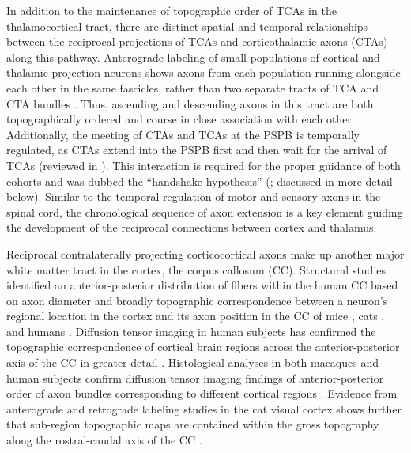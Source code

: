 In addition to the maintenance of topographic order of TCAs in the thalamocortical tract, there are distinct spatial and temporal relationships between the reciprocal projections of TCAs and corticothalamic axons (CTAs) along this pathway. 
Anterograde labeling of small populations of cortical and thalamic projection neurons shows axons from each population running alongside each other in the same fascicles, rather than two separate tracts of TCA and CTA bundles \cite{molnar1998mechanisms}. 
Thus, ascending and descending axons in this tract are both topographically ordered and course in close association with each other. 
Additionally, the meeting of CTAs and TCAs at the PSPB is temporally regulated, as CTAs extend into the PSPB first and then wait for the arrival of TCAs (reviewed in \cite{leyva2013and}). 
This interaction is required for the proper guidance of both cohorts and was dubbed the “handshake hypothesis” (\cite{molnar1995thalamic}; discussed in more detail below). 
Similar to the temporal regulation of motor and sensory axons in the spinal cord, the chronological sequence of axon extension is a key element guiding the development of the reciprocal connections between cortex and thalamus. 

Reciprocal contralaterally projecting corticocortical axons make up another major white matter tract in the cortex, the corpus callosum (CC). 
Structural studies identified an anterior-posterior distribution of fibers within the human CC based on axon diameter \cite{aboitiz1992fiber} and broadly topographic correspondence between a neuron’s regional location in the cortex and its axon position in the CC of mice \cite{ozaki1992prenatal}, cats \cite{nakamura1989topography}, and humans \cite{de1985topography}. 
Diffusion tensor imaging in human subjects has confirmed the topographic correspondence of cortical brain regions across the anterior-posterior axis of the CC in greater detail \cite{hofer2006topography}. 
Histological analyses in both macaques and human subjects confirm diffusion tensor imaging findings of anterior-posterior order of axon bundles corresponding to different cortical regions \cite{caminiti2013diameter}.
Evidence from anterograde and retrograde labeling studies in the cat visual cortex shows further that sub-region topographic maps are contained within the gross topography along the rostral-caudal axis of the CC \cite{payne1991visual}. 

